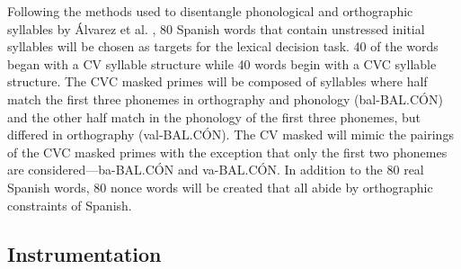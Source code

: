 Following the methods used to disentangle phonological and orthographic syllables by Álvarez et al. \parencite*{Alvarez2004-nd}, 80 Spanish words that contain unstressed initial syllables will be chosen as targets for the lexical decision task. 40 of the words began with a CV syllable structure while 40 words begin with a CVC syllable structure. The CVC masked primes will be composed of syllables where half match the first three phonemes in orthography and phonology (bal-BAL.CÓN) and the other half match in the phonology of the first three phonemes, but differed in orthography (val-BAL.CÓN). The CV masked will mimic the pairings of the CVC masked primes with the exception that only the first two phonemes are considered—ba-BAL.CÓN and va-BAL.CÓN. In addition to the 80 real Spanish words, 80 nonce words will be created that all abide by orthographic constraints of Spanish.


\subsection{Instrumentation}

